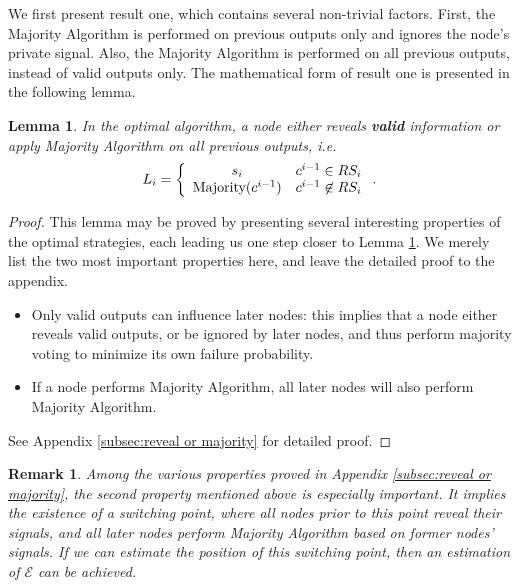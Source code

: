 \documentclass[a4paper,UKenglish]{lipics}
\newtheorem{lem}[thm]{Lemma}
\newtheorem{rmk}{Remark}
\theoremstyle{definition}
\begin{document}
We first present result one,
	which contains several non-trivial factors.
First, the Majority Algorithm is performed on previous outputs only and ignores the node's private signal.
Also, the Majority Algorithm is performed on all previous outputs, instead of valid outputs only.
The mathematical form of result one is presented in the following lemma.
\begin{lem}
\label{lem:reveal or majority}
In the optimal algorithm, a node either reveals \textbf{valid} information or apply Majority Algorithm on all previous outputs, i.e.
\begin{equation*}
L_i 
= \left\{ 
	\begin{array}{c l}
		s_i & c^{i-1} \in RS_i \\
 		\text{Majority}(c^{i-1}) & c^{i-1} \not \in RS_i
 	\end{array}
\right..
\end{equation*}
\end{lem}

\begin{proof}
This lemma may be proved by presenting several interesting properties of the optimal strategies,
	each leading us one step closer to Lemma \ref{lem:reveal or majority}.
We merely list the two most important properties here, and leave the detailed proof to the appendix.
\begin{itemize}
\item Only valid outputs can influence later nodes: this implies that a node either reveals valid outputs,
		or be ignored by later nodes, and thus perform majority voting to minimize its own failure probability.
\item If a node performs Majority Algorithm, all later nodes will also perform Majority Algorithm.
\end{itemize}
See Appendix \ref{subsec:reveal or majority} for detailed proof.
\end{proof}

\begin{rmk}
\label{rmk1}
Among the various properties proved in Appendix \ref{subsec:reveal or majority}, the second property mentioned above is especially important.
It implies the existence of a switching point, 
	where all nodes prior to this point reveal their signals, 
	and all later nodes perform Majority Algorithm based on former nodes' signals. 
If we can estimate the position of this switching point,
	then an estimation of $\mathcal{E}$ can be achieved.
\end{rmk}
\end{document}
